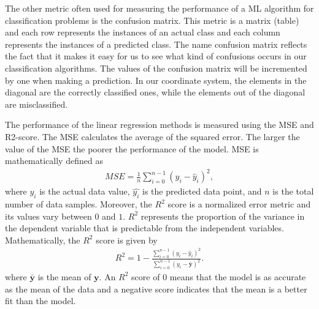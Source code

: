 \documentclass[a4paper]{article}
\begin{document}
The other metric often used for measuring the performance of a ML
algorithm for classification problems is the confusion matrix. This metric is a matrix (table) and each row represents the instances of an actual class and each column represents the instances of a predicted class. The name confusion matrix reflects the fact that it makes it easy for us to see what kind of confusions occurs in our classification algorithms. The values of the confusion matrix will be incremented by one when making a prediction. In our coordinate system, the elements in the diagonal are the correctly classified ones, while the elements out of the diagonal are misclassified. 

The performance of the linear regression methods is measured using the MSE and R2-score. The MSE calculates the average of the squared error. The larger the value of the MSE the poorer the performance of the model. MSE is mathematically defined as
\begin{align}
    MSE = \frac{1}{n}
    \sum_{i=0}^{n-1}(y_i-\hat{y}_i)^2,
    \label{eq:MSE}
\end{align}
where $y_i$ is the actual data value, $\hat{y_i}$ is the predicted data point, and $n$ is the total number of data samples. Moreover, the $R^2$ score is a normalized error metric and its values vary between $0$ and $1$. $R^2$ represents the proportion of the variance in the dependent variable that is predictable from the independent variables. Mathematically, the $R^2$ score is given by
\begin{align}
    R^2 = 1 - \frac{\sum_{i=0}^{n - 1} (y_i - \hat{y}_i)^2}{\sum_{i=0}^{n - 1} (y_i - \bar{\mathbf{y}})^2}.
    \label{eq:R2}
\end{align}
where $\bar{\mathbf{y}}$ is the mean of $\mathbf{y}$. An $R^2$ score of $0$ means that the model is as accurate as the mean of the data and a negative score indicates that the mean is a better fit than the model.
\end{document}
